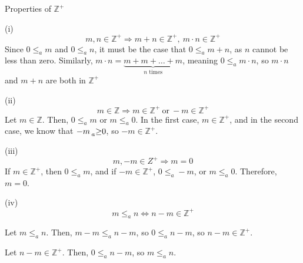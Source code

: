\documentclass[12pt]{extarticle}
\title{}
\author{Avinash Iyer}
\date{}
\newcommand{\Z}{\mathbb{Z}}
\begin{document}
  \begin{problem}{Properties of $\Z^+$}
    \begin{problem}{(i)}
      \[
        m,n\in\Z^+ \Rightarrow m+n\in\Z^+,~m\cdot n\in\Z^+
      \] 
      \tcblower
      Since $0\leq_a m$ and $0\leq_a n$, it must be the case that $0\leq_a m+n$, as $n$ cannot be less than zero. Similarly, $m\cdot n = \underbrace{m+m+\dots+m}_{\text{$n$ times}}$, meaning $0\leq_a m\cdot n$, so $m\cdot n$ and $m+n$ are both in $\Z^+$
    \end{problem}
    \begin{problem}{(ii)}
      \[
        m\in \Z \Rightarrow m\in \Z^+~\text{or}~-m\in\Z^+
      \] 
      \tcblower
      Let $m\in \Z$. Then, $0\leq_a m$ or $m\leq_a 0$. In the first case, $m\in \Z^+$, and in the second case, we know that $-m \prescript{}{a}\geq 0$, so $-m\in \Z^+$. 
    \end{problem}
    \begin{problem}{(iii)}
      \[
        m,-m\in Z^+ \Rightarrow m=0
      \] 
      \tcblower
      If $m\in \Z^+$, then $0\leq_a m$, and if $-m\in \Z^+$, $0\leq_a -m$, or $m\leq_a 0$. Therefore, $m=0$.
    \end{problem}
    \begin{problem}{(iv)}
      \[
        m\leq_a n \Leftrightarrow n-m\in \Z^+
      \] 
      \tcblower
      \begin{description}[font=\normalfont]
        \item[$(\Rightarrow)$] Let $m\leq_a n$. Then, $m-m \leq_a n-m$, so $0\leq_a n-m$, so $n-m\in \Z^+$.
        \item[$(\Leftarrow)$] Let $n-m\in \Z^+$. Then, $0\leq_a n-m$, so $m\leq_a n$.
      \end{description}
    \end{problem}
  \end{problem}
\end{document}
